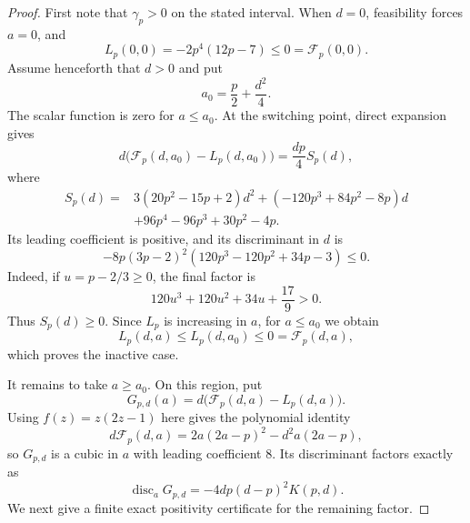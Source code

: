\documentclass[11pt]{article}
\begin{document}
\begin{proof}
First note that $\gamma_p>0$ on the stated interval.  When $d=0$,
feasibility forces $a=0$, and
\[
 L_p(0,0)=-2p^4(12p-7)\leq0=\mathcal F_p(0,0).
\]
Assume henceforth that $d>0$ and put
\[
 a_0=\frac p2+\frac{d^2}{4}.
\]
The scalar function is zero for $a\leq a_0$.  At the switching point,
direct expansion gives
\begin{equation}
 d\bigl(\mathcal F_p(d,a_0)-L_p(d,a_0)\bigr)
 =\frac{dp}{4}S_p(d),
 \label{eq:switch}
\end{equation}
where
\begin{align*}
 S_p(d)={}&3(20p^2-15p+2)d^2
 +(-120p^3+84p^2-8p)d\\
 &+96p^4-96p^3+30p^2-4p.
\end{align*}
Its leading coefficient is positive, and its discriminant in $d$ is
\[
 -8p(3p-2)^2(120p^3-120p^2+34p-3)\leq0.
\]
Indeed, if $u=p-2/3\geq0$, the final factor is
\[
 120u^3+120u^2+34u+\frac{17}{9}>0.
\]
Thus $S_p(d)\geq0$.  Since $L_p$ is increasing in $a$, for $a\leq a_0$
we obtain
\[
 L_p(d,a)\leq L_p(d,a_0)\leq0=\mathcal F_p(d,a),
\]
which proves the inactive case.

It remains to take $a\geq a_0$.  On this region, put
\begin{equation}
 G_{p,d}(a)=d\bigl(\mathcal F_p(d,a)-L_p(d,a)\bigr).
 \label{eq:G}
\end{equation}
Using $f(z)=z(2z-1)$ here gives the polynomial identity
\[
 d\mathcal F_p(d,a)=2a(2a-p)^2-d^2a(2a-p),
\]
so $G_{p,d}$ is a cubic in $a$ with leading coefficient $8$.
Its discriminant factors exactly as
\begin{equation}
 \operatorname{disc}_aG_{p,d}
 =-4dp(d-p)^2K(p,d).
 \label{eq:discriminant}
\end{equation}
We next give a finite exact positivity certificate for the remaining
factor.


\end{proof}
\end{document}
